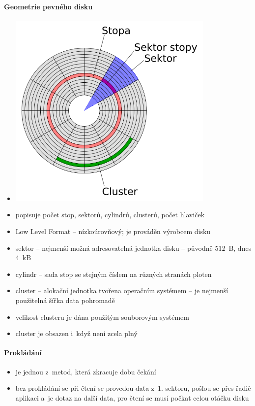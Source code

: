 \documentclass[a4paper,12pt]{article}
\providecommand{\tightlist}{%
\setlength{\itemsep}{0pt}\setlength{\parskip}{0pt}}
\begin{document}
\paragraph{Geometrie pevného disku}

\begin{itemize}
\tightlist
\item[] \includegraphics[width=10.089cm]{ref/geometrie-disku.png}
\item popisuje počet stop, sektorů, cylindrů, clusterů, počet hlaviček
\item Low Level Format -- nízkoúrovňový; je prováděn výrobcem disku
\item sektor -- nejmenší možná adresovatelná jednotka disku -- původně 512~B,
dnes 4~kB
\item cylindr -- sada stop se stejným číslem na různých stranách ploten
\item cluster -- alokační jednotka tvořena operačním systémem -- je nejmenší
  použitelná šířka data pohromadě
\item velikost clusteru je dána použitým souborovým systémem
\item cluster je obsazen i~když není zcela plný
\end{itemize}

\paragraph{Prokládání}

\begin{itemize}
\tightlist
\item je jednou z~metod, která zkracuje dobu čekání
\item bez prokládání se při čtení se provedou data z~1. sektoru, pošlou se
  přes řadič aplikaci a~je dotaz na další data, pro čtení se musí počkat
  celou otáčku disku
\end{itemize}
\end{document}
